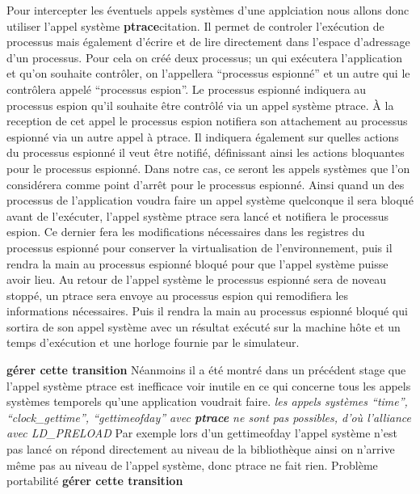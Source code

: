Pour intercepter les éventuels appels systèmes d'une applciation nous allons
donc utiliser l'appel système \textbf{ptrace}{\color{red}citation}. Il permet de
controler l'exécution de processus mais également d'écrire et de lire
directement dans l'espace d'adressage d'un processus. Pour cela on créé deux
processus; un qui exécutera l'application et qu'on souhaite contrôler, on
l'appellera ``processus espionné'' et un autre qui le contrôlera appelé
``processus espion''. Le processus espionné indiquera au processus espion qu'il
souhaite être contrôlé via un appel système ptrace. À la reception de cet appel
le processus espion notifiera son attachement au processus espionné via un autre
appel à ptrace. Il indiquera également sur quelles actions du processus espionné
il veut être notifié, définissant ainsi les actions bloquantes pour le processus
espionné. Dans notre cas, ce seront les appels systèmes que l'on considérera
comme point d'arrêt pour le processus espionné. Ainsi quand un des processus de
l'application voudra faire un appel système quelconque il sera bloqué avant de
l'exécuter, l'appel système ptrace sera lancé et notifiera le processus
espion. Ce dernier fera les modifications nécessaires dans les registres du
processus espionné pour conserver la virtualisation de l'environnement, puis il
rendra la main au processus espionné bloqué pour que l'appel système puisse
avoir lieu. Au retour de l'appel système le processus espionné sera de noveau
stoppé, un ptrace sera envoye au processus espion qui remodifiera les
informations nécessaires. Puis il rendra la main au processus espionné bloqué
qui sortira de son appel système avec un résultat exécuté sur la machine hôte et
un temps d'exécution et une horloge fournie par le simulateur.

{\color{red} \textbf{gérer cette transition}} Néanmoins il a été montré dans un
précédent stage que l'appel système ptrace est inefficace voir inutile en ce qui
concerne tous les appels systèmes temporels qu'une application voudrait
faire. \textit{les appels systèmes ``time'', ``clock\_gettime'',
  ``gettimeofday'' avec \textbf{ptrace} ne sont pas possibles, d'où l'alliance
  avec LD\_PRELOAD} Par exemple lors d'un gettimeofday l'appel système n'est pas
lancé on répond directement au niveau de la bibliothèque ainsi on n'arrive même
pas au niveau de l'appel système, donc ptrace ne fait rien.  Problème
portabilité {\color{red} \textbf{gérer cette transition}}

